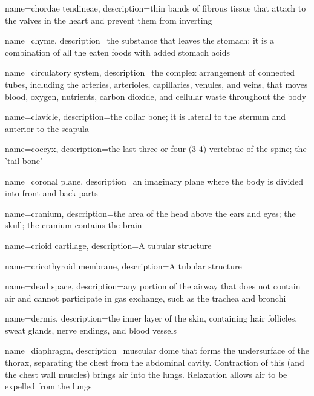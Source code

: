 \documentclass[../../EMT-169.tex]{subfiles}
\begin{document}
	{
		name=chordae tendineae,
		description={thin bands of fibrous tissue that attach to the valves in the heart and prevent them from inverting}
	}

	{
		name=chyme,
		description={the substance that leaves the stomach; it is a combination of all the eaten foods with added stomach acids}
	}

	{
		name=circulatory system,
		description={the complex arrangement of connected tubes, including the arteries, arterioles, capillaries, venules, and veins, that moves blood, oxygen, nutrients, carbon dioxide, and cellular waste throughout the body}
	}

	{
		name=clavicle,
		description={the collar bone; it is lateral to the sternum and anterior to the scapula}
	}

	{
		name=coccyx,
		description={the last three or four (3-4) vertebrae of the spine; the 'tail bone'}
	}

	{
		name=coronal plane,
		description={an imaginary plane where the body is divided into front and back parts}
	}

	{
		name=cranium,
		description={the area of the head above the ears and eyes; the skull; the cranium contains the brain}
	}

	{
		name=crioid cartilage,
		description={A tubular structure }
	}
	
	{
		name=cricothyroid membrane,
		description={A tubular structure }
	}
	
	{
		name=dead space,
		description={any portion of the airway that does not contain air and cannot participate in gas exchange, such as the trachea and bronchi}
	}

	{
		name=dermis,
		description={the inner layer of the skin, containing hair follicles, sweat glands, nerve endings, and blood vessels}
	}
	
	{
		name=diaphragm,
		description={muscular dome that forms the undersurface of the thorax, separating the chest from the abdominal cavity. Contraction of this (and the chest wall muscles) brings air into the lungs. Relaxation allows air to be expelled from the lungs}
	}
	
\end{document}
